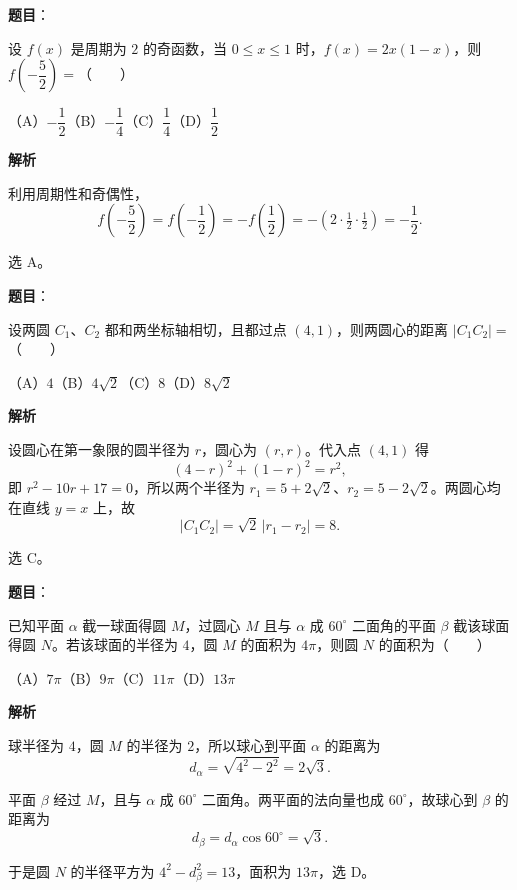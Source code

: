 \begin{answer}

\textbf{题目}：

设 $f(x)$ 是周期为 $2$ 的奇函数，当 $0\leq x\leq1$ 时，$f(x)=2x(1-x)$，则 $f\left(-\dfrac52\right)=$\mbox{（　　）}

（A）$-\dfrac12$\quad（B）$-\dfrac14$\quad（C）$\dfrac14$\quad（D）$\dfrac12$

\textbf{解析}

利用周期性和奇偶性，
\nopagebreak[4]
\[
f\left(-\frac52\right)=f\left(-\frac12\right)
=-f\left(\frac12\right)
=-(2\cdot\tfrac12\cdot\tfrac12)=-\frac12.
\]

选 A。


\end{answer}
\begin{answer}

\textbf{题目}：

设两圆 $C_1\text{、}C_2$ 都和两坐标轴相切，且都过点 $(4,1)$，则两圆心的距离 $|C_1C_2|=$\mbox{（　　）}

（A）$4$\quad（B）$4\sqrt2$\quad（C）$8$\quad（D）$8\sqrt2$

\textbf{解析}

设圆心在第一象限的圆半径为 $r$，圆心为 $(r,r)$。代入点 $(4,1)$ 得
\nopagebreak[4]
\[
(4-r)^2+(1-r)^2=r^2,
\]
即 $r^2-10r+17=0$，所以两个半径为
$r_1=5+2\sqrt2$、$r_2=5-2\sqrt2$。两圆心均在直线 $y=x$ 上，故
\nopagebreak[4]
\[
|C_1C_2|=\sqrt2\,|r_1-r_2|=8.
\]

选 C。


\end{answer}
\begin{answer}

\textbf{题目}：

已知平面 $\alpha$ 截一球面得圆 $M$，过圆心 $M$ 且与 $\alpha$ 成 $60^\circ$ 二面角的平面 $\beta$ 截该球面得圆 $N$。若该球面的半径为 $4$，圆 $M$ 的面积为 $4\pi$，则圆 $N$ 的面积为\mbox{（　　）}

（A）$7\pi$\quad（B）$9\pi$\quad（C）$11\pi$\quad（D）$13\pi$

\textbf{解析}

球半径为 $4$，圆 $M$ 的半径为 $2$，所以球心到平面
$\alpha$ 的距离为
\nopagebreak[4]
\[
d_\alpha=\sqrt{4^2-2^2}=2\sqrt3.
\]

平面 $\beta$ 经过 $M$，且与 $\alpha$ 成 $60^\circ$ 二面角。两平面的法向量也成 $60^\circ$，故球心到 $\beta$ 的距离为
\nopagebreak[4]
\[
d_\beta=d_\alpha\cos60^\circ=\sqrt3.
\]

于是圆 $N$ 的半径平方为 $4^2-d_\beta^2=13$，面积为 $13\pi$，选 D。


\end{answer}
